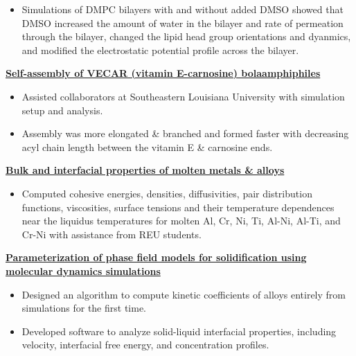 \begin{cventries}
{\begin{cvitems}
                \vspace{2pt}
                \begin{itemize}
                    \item Simulations of DMPC bilayers with and without added DMSO showed that DMSO increased the amount of water in the bilayer and rate of permeation through the bilayer, changed the lipid head group orientations and dyanmics, and modified the electrostatic potential profile across the bilayer.
                \end{itemize}
            \item {\textbf{\underline{Self-assembly of VECAR (vitamin E-carnosine) bolaamphiphiles}}}
                \vspace{2pt}
                \begin{itemize}
                \item {Assisted collaborators at Southeastern Louisiana University with simulation setup and analysis.}
                \item{Assembly was more elongated \& branched and formed faster with decreasing acyl chain length between the vitamin E \& carnosine ends.}
                \end{itemize}
            \item {\textbf{\underline{Bulk and interfacial properties of molten metals \& alloys}}}
                \vspace{2pt}
                \begin{itemize}
                    \item Computed cohesive energies, densities, diffusivities, pair distribution functions, viscosities, surface tensions and their temperature dependences near the liquidus temperatures for molten Al, Cr, Ni, Ti, Al-Ni, Al-Ti, and Cr-Ni with assistance from REU students.
                \end{itemize}
            \item {\textbf{\underline{Parameterization of phase field models for solidification using molecular dynamics simulations}}}
                \vspace{2pt}
                \begin{itemize}
                    \item {Designed an algorithm to compute kinetic coefficients of alloys entirely from simulations for the first time.}
                    \item {Developed software to analyze solid-liquid interfacial properties, including velocity, interfacial free energy, and concentration profiles.}

\end{itemize}
\end{cvitems}}
\end{cventries}
